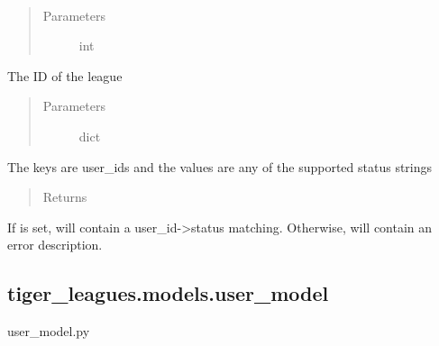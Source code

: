 \documentclass[letterpaper,10pt,english]{sphinxmanual}
\begin{document}

\begin{fulllineitems}
\label{\detokenize{tiger_leagues/models/readme:tiger_leagues.models.admin_model.update_join_league_requests}}~\begin{quote}\begin{description}
\item[{Parameters}] \leavevmode
{} \textendash{} int

\end{description}\end{quote}

The ID of the league
\begin{quote}\begin{description}
\item[{Parameters}] \leavevmode
{} \textendash{} dict

\end{description}\end{quote}

The keys are user\_ids and the values are any of the supported status strings
\begin{quote}\begin{description}
\item[{Returns}] \leavevmode
{}

\end{description}\end{quote}

If  is set,  will contain a user\_id-\textgreater{}status matching. 
Otherwise,  will contain an error description.

\end{fulllineitems}



\subsection{tiger\_leagues.models.user\_model}
\label{\detokenize{tiger_leagues/models/readme:module-tiger_leagues.models.user_model}}\label{\detokenize{tiger_leagues/models/readme:tiger-leagues-models-user-model}}
user\_model.py
\end{document}
